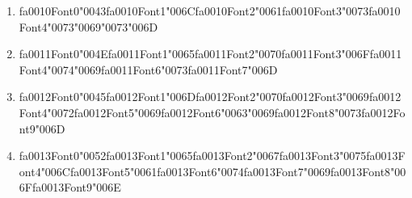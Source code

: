\documentclass[12pt]{article}
\begin{document}
\begin{enumerate}[label=\arabic*.]
\begin{enumerate}[label=(\alph*)]
    \item {\csname fa0010Font0\endcsname\char"0043}{\csname fa0010Font1\endcsname\char"006C}{\csname fa0010Font2\endcsname\char"0061}{\csname fa0010Font3\endcsname\char"0073}{\csname fa0010Font4\endcsname\char"0073}{\char"0069}{\char"0073}{\char"006D}
    \item {\csname fa0011Font0\endcsname\char"004E}{\csname fa0011Font1\endcsname\char"0065}{\csname fa0011Font2\endcsname\char"0070}{\csname fa0011Font3\endcsname\char"006F}{\csname fa0011Font4\endcsname\char"0074}{\char"0069}{\csname fa0011Font6\endcsname\char"0073}{\csname fa0011Font7\endcsname\char"006D}
    \item {\csname fa0012Font0\endcsname\char"0045}{\csname fa0012Font1\endcsname\char"006D}{\csname fa0012Font2\endcsname\char"0070}{\csname fa0012Font3\endcsname\char"0069}{\csname fa0012Font4\endcsname\char"0072}{\csname fa0012Font5\endcsname\char"0069}{\csname fa0012Font6\endcsname\char"0063}{\char"0069}{\csname fa0012Font8\endcsname\char"0073}{\csname fa0012Font9\endcsname\char"006D}
    \item {\csname fa0013Font0\endcsname\char"0052}{\csname fa0013Font1\endcsname\char"0065}{\csname fa0013Font2\endcsname\char"0067}{\csname fa0013Font3\endcsname\char"0075}{\csname fa0013Font4\endcsname\char"006C}{\csname fa0013Font5\endcsname\char"0061}{\csname fa0013Font6\endcsname\char"0074}{\csname fa0013Font7\endcsname\char"0069}{\csname fa0013Font8\endcsname\char"006F}{\csname fa0013Font9\endcsname\char"006E}
\end{enumerate}
\end{enumerate}
\end{document}
